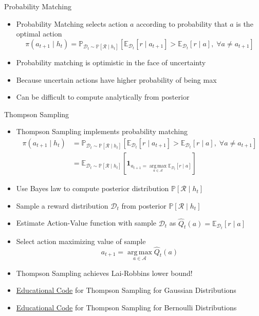 \begin{frame}{Probability Matching}
\begin{itemize}
    \item Probability Matching selects action $a$ according to probability that $a$
          is the optimal action
    \[
        \pi(a_{t+1} \mid h_t) = \mathbb{P}_{\mathcal{D}_t \sim \mathbb{P}[\mathcal{R} \mid h_t]}\!\left[\mathbb{E}_{\mathcal{D}_t}[r \mid a_{t+1}] > \mathbb{E}_{\mathcal{D}_t}[r \mid a], \; \forall a \neq a_{t+1}\right]
    \]
    \item Probability matching is optimistic in the face of uncertainty
    \item Because uncertain actions have higher probability of being max
    \item Can be difficult to compute analytically from posterior
\end{itemize}
\end{frame}

\begin{frame}[shrink=20]{Thompson Sampling}
\begin{itemize}
    \item Thompson Sampling implements probability matching
    \begin{align*}
        \pi(a_{t+1} \mid h_t) &= \mathbb{P}_{\mathcal{D}_t \sim \mathbb{P}[\mathcal{R} \mid h_t]}\!\left[\mathbb{E}_{\mathcal{D}_t}[r \mid a_{t+1}] > \mathbb{E}_{\mathcal{D}_t}[r \mid a], \; \forall a \neq a_{t+1}\right] \\
        &= \mathbb{E}_{\mathcal{D}_t \sim \mathbb{P}[\mathcal{R} \mid h_t]}\!\left[\mathbf{1}_{a_{t+1} = \operatorname*{arg\,max}_{a \in \mathcal{A}} \mathbb{E}_{\mathcal{D}_t}[r \mid a]}\right]
    \end{align*}
    \item Use Bayes law to compute posterior distribution $\mathbb{P}[\mathcal{R} \mid h_t]$
    \item Sample a reward distribution $\mathcal{D}_t$ from posterior $\mathbb{P}[\mathcal{R} \mid h_t]$
    \item Estimate Action-Value function with sample $\mathcal{D}_t$ as $\hat{Q}_t(a) = \mathbb{E}_{\mathcal{D}_t}[r \mid a]$
    \item Select action maximizing value of sample
    \[
        a_{t+1} = \operatorname*{arg\,max}_{a \in \mathcal{A}} \hat{Q}_t(a)
    \]
    \item Thompson Sampling achieves Lai-Robbins lower bound!
    \item \href{https://github.com/TikhonJelvis/RL-book/tree/master/rl/chapter14/ts_gaussian.py}{Educational Code} for Thompson Sampling for Gaussian Distributions
    \item \href{https://github.com/TikhonJelvis/RL-book/tree/master/rl/chapter14/ts_bernoulli.py}{Educational Code} for Thompson Sampling for Bernoulli Distributions
\end{itemize}
\end{frame}
